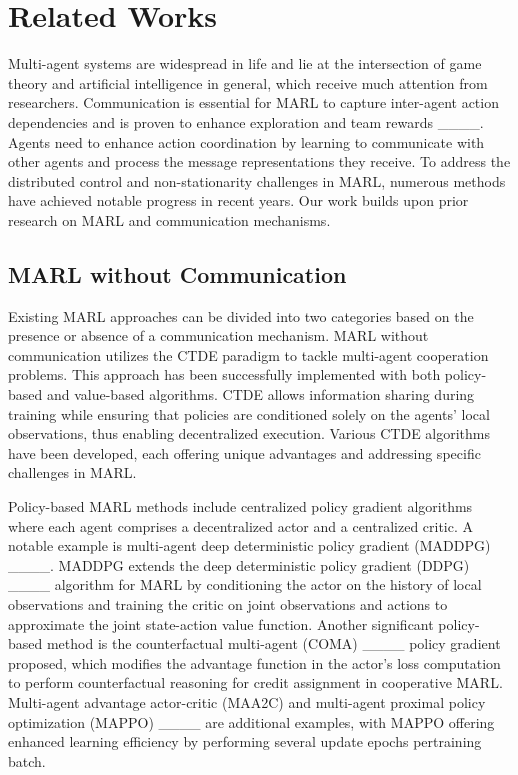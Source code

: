 \section{Related Works}
\label{S_2}

Multi-agent systems are widespread in life and lie at the intersection of game theory and artificial intelligence in general, which receive much attention from researchers. Communication is essential for MARL to capture inter-agent action dependencies and is proven to enhance exploration and team rewards ____. Agents need to enhance action coordination by learning to communicate with other agents and process the message representations they receive. To address the distributed control and non-stationarity challenges in MARL, numerous methods have achieved notable progress in recent years. Our work builds upon prior research on MARL and communication mechanisms. 


\subsection{MARL without Communication}

Existing MARL approaches can be divided into two categories based on the presence or absence of a communication mechanism. MARL without communication utilizes the CTDE paradigm to tackle multi-agent cooperation problems. This approach has been successfully implemented with both policy-based and value-based algorithms. CTDE allows information sharing during training while ensuring that policies are conditioned solely on the agents' local observations, thus enabling decentralized execution. Various CTDE algorithms have been developed, each offering unique advantages and addressing specific challenges in MARL.

Policy-based MARL methods include centralized policy gradient algorithms where each agent comprises a decentralized actor and a centralized critic. A notable example is multi-agent deep deterministic policy gradient (MADDPG) ____. MADDPG extends the deep deterministic policy gradient (DDPG) ____ algorithm for MARL by conditioning the actor on the history of local observations and training the critic on joint observations and actions to approximate the joint state-action value function. Another significant policy-based method is the counterfactual multi-agent (COMA) ____ policy gradient proposed, which modifies the advantage function in the actor’s loss computation to perform counterfactual reasoning for credit assignment in cooperative MARL. Multi-agent advantage actor-critic (MAA2C) and multi-agent proximal policy optimization (MAPPO) ____ are additional examples, with MAPPO offering enhanced learning efficiency by performing several update epochs pertraining batch.

